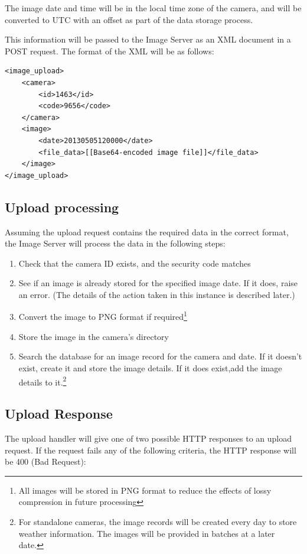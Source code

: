 \documentclass[11pt]{article}
\begin{document}
The image date and time will be in the local time zone of the camera, and will be converted to UTC with an offset as part of the data storage process.

This information will be passed to the Image Server as an XML document in a POST request. The format of the XML will be as follows:

\begin{verbatim}
<image_upload>
    <camera>
        <id>1463</id>
        <code>9656</code>
    </camera>
    <image>
        <date>20130505120000</date>
        <file_data>[[Base64-encoded image file]]</file_data>
    </image>
</image_upload>
\end{verbatim}


\subsection{Upload processing}
Assuming the upload request contains the required data in the correct format, the Image Server will process the data in the following steps:

\begin{enumerate}
\item Check that the camera ID exists, and the security code matches
\item See if an image is already stored for the specified image date. If it does, raise an error. (The details of the action taken in this instance is described later.)
\item Convert the image to PNG format if required\footnote{All images will be stored in PNG format to reduce the effects of lossy compression in future processing}
\item Store the image in the camera's directory
\item Search the database for an image record for the camera and date. If it doesn't exist, create it and store the image details. If it does exist,add the image details to it.\footnote{For standalone cameras, the image records will be created every day to store weather information. The images will be provided in batches at a later date.}
\end{enumerate}

\subsection{Upload Response}
The upload handler will give one of two possible HTTP responses to an upload request. If the request fails any of the following criteria, the HTTP response will be 400 (Bad Request):
\end{document}
